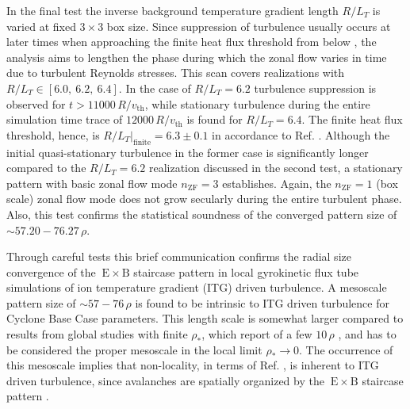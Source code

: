 \documentclass[aip, amsmath, amssymb, reprint, twocolumn, floatfix]{revtex4-1}
\newcommand{\exb}{\mathrm{\:E}\times\mathrm{B}}
\newcommand{\rlt}{R/L_T}
\newcommand{\rhoth}{\rho}
\newcommand{\vth}{v_{\mathrm{th}}}
\newcommand{\nzf}{n_\mathrm{ZF}}
\begin{document}
In the final test the inverse background temperature gradient length $\rlt$ is varied at fixed $3\times3$ box size.
Since suppression of turbulence usually occurs at later times when approaching the finite heat flux threshold from below \cite{Peeters2016}, the analysis aims to lengthen the phase during which the zonal flow varies in time due to turbulent Reynolds stresses.
This scan covers realizations with $\rlt \in [6.0,~6.2,~6.4]$.
In the case of $\rlt = 6.2$ turbulence suppression is observed for $t > 11000\,R/\vth$, while stationary turbulence during the entire simulation time trace of $12000\,R/\vth$ is found for $\rlt = 6.4$.
The finite heat flux threshold, hence, is $\rlt|_\mathrm{finite} = 6.3 \pm 0.1$ in accordance to Ref. .
Although the initial quasi-stationary turbulence in the former case is significantly longer compared to the $\rlt = 6.2$ realization discussed in the second test, a stationary pattern with basic zonal flow mode $\nzf = 3$ establishes. 
Again, the $\nzf = 1$ (box scale) zonal flow mode does not grow secularly during the entire turbulent phase.
Also, this test confirms the statistical soundness of the converged pattern size of $\sim 57.20 - 76.27\,\rhoth$.\\

\bigskip
\bigskip
\bigskip



Through careful tests this brief communication confirms the radial size convergence of the $\exb$ staircase pattern in local gyrokinetic flux tube simulations of ion temperature gradient (ITG) driven turbulence.
A mesoscale pattern size of $\sim 57 - 76\,\rhoth$ is found to be intrinsic to ITG driven turbulence for Cyclone Base Case parameters.
This length scale is somewhat larger compared to results from global studies with finite $\rho_\ast$, which report of a few $10\,\rhoth$ \cite{Pradalier2010}, and has to be considered the proper mesoscale in the local limit $\rho_\ast \rightarrow 0$.  
The occurrence of this mesoscale implies that non-locality, in terms of Ref. , is inherent to ITG driven turbulence, since avalanches are spatially organized by the $\exb$ staircase pattern \cite{McMillan2009, Pradalier2010, Rath2016, Peeters2016}. 
\end{document}
